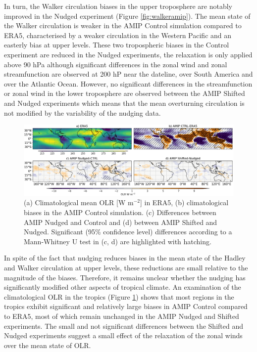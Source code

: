 In turn, the Walker circulation biases in the upper troposphere are notably improved in the Nudged experiment (Figure \ref{fig:walkeramip}). The mean state of the Walker circulation is weaker in the AMIP Control simulation compared to ERA5, characterised by a weaker circulation in the Western Pacific and an easterly bias at upper levels. These two tropospheric biases in the Control experiment are reduced in the Nudged experiments, the relaxation is only applied above 90 hPa although significant differences in the zonal wind and zonal streamfunction are observed at 200 hP near the dateline, over South America and over the Atlantic Ocean. 
However, no significant differences in the streamfunction or zonal wind in the lower troposphere are observed between the AMIP Shifted and Nudged experiments which means that the mean overturning circulation is not modified by the variability of the nudging data.

\begin{figure}[t!]
\centering
 \includegraphics[width=\linewidth]{figures/olr_check.png}
\caption[Annual mean OLR  in atmosphere-only experiments]{(a) Climatological mean OLR [W m$^{-2}$] in ERA5, (b) climatological biases in the AMIP Control simulation. (c) Differences between AMIP Nudged and Control and (d) between AMIP Shifted and Nudged. Significant (95\% confidence level) differences according to a Mann-Whitney U test in (c, d) are highlighted with hatching. }
\label{fig:olr-mean}
\end{figure}

In spite of the fact that nudging reduces biases in the mean state of the Hadley and Walker circulation at upper levels, these reductions are small relative to the magnitude of the biases. 
Therefore, it remains unclear whether the nudging has significantly modified other aspects of tropical climate. 
An examination of the climatological  OLR in the tropics (Figure \ref{fig:olr-mean}) shows that most regions in the tropics exhibit significant and relatively large biases in AMIP Control compared to ERA5, most of which remain unchanged in the AMIP Nudged and Shifted experiments. The small and not significant differences between the Shifted and Nudged experiments suggest a small effect of the relaxation of the zonal winds over the mean state of OLR. 

